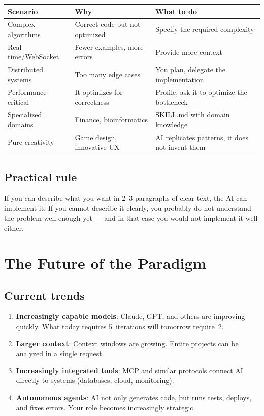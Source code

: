 \begin{center}
\begin{small}
\begin{tabularx}{\textwidth}{l X X}
\toprule
\textbf{Scenario} & \textbf{Why} & \textbf{What to do} \\
\midrule
Complex algorithms & Correct code but not optimized & Specify the required complexity \\
Real-time/WebSocket & Fewer examples, more errors & Provide more context \\
Distributed systems & Too many edge cases & You plan, delegate the implementation \\
Performance-critical & It optimizes for correctness & Profile, ask it to optimize the bottleneck \\
Specialized domains & Finance, bioinformatics & SKILL.md with domain knowledge \\
Pure creativity & Game design, innovative UX & AI replicates patterns, it does not invent them \\
\bottomrule
\end{tabularx}
\end{small}
\end{center}

\subsection{Practical rule}

\begin{notebox}
If you can describe what you want in 2--3 paragraphs of clear text, the AI can implement it. If you cannot describe it clearly, you probably do not understand the problem well enough yet --- and in that case you would not implement it well either.
\end{notebox}

\section{The Future of the Paradigm}

\subsection{Current trends}

\begin{enumerate}
  \item \textbf{Increasingly capable models}: Claude, GPT, and others are improving quickly. What today requires 5~iterations will tomorrow require~2.
  \item \textbf{Larger context}: Context windows are growing. Entire projects can be analyzed in a single request.
  \item \textbf{Increasingly integrated tools}: MCP and similar protocols connect AI directly to systems (databases, cloud, monitoring).
  \item \textbf{Autonomous agents}: AI not only generates code, but runs tests, deploys, and fixes errors. Your role becomes increasingly strategic.
\end{enumerate}

